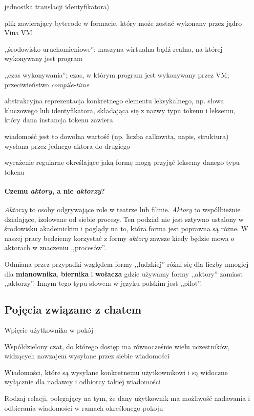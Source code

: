 \begin{labeling}{jednostka translacji}
        identyfikatora)
    \item[plik wykonywalny] plik zawierający bytecode w formacie, który może zostać wykonany przez jądro Viua
        VM
    \item[runtime] ,,środowisko uruchomieniowe''; maszyna wirtualna bądź realna, na której
        wykonywany jest program
    \item[\emph{run-time}] ,,czas wykonywania''; czas, w którym program jest wykonywany przez VM;
        przeciwieństwo \emph{compile-time}
    \item[token] abstrakcyjna reprezentacja konkretnego elementu leksykalnego, np. słowa kluczowego lub
        identyfikatora, składająca się z nazwy typu tokenu i leksemu, który dana instancja tokenu zawiera
	\item[wiadomość] wiadomość jest to dowolna wartość (np. liczba całkowita,
		napis, struktura) wysłana przez jednego aktora do drugiego
    \item[wzorzec] wyrażenie regularne określające jaką formę mogą przyjąć leksemy danego typu tokenu
\end{labeling}

\paragraph*{Czemu \emph{aktory}, a nie \emph{aktorzy}?}
\label{glossary_actors}

\emph{Aktorzy} to osoby odgrywające role w teatrze lub filmie. \emph{Aktory} to
współbieżnie działające, izolowane od siebie procesy. Ten podział nie jest
sztywno ustalony w środowisku akademickim i poglądy na to, która forma jest
poprawna są różne. W naszej pracy będziemy korzystać z formy \emph{aktory}
zawsze kiedy będzie mowa o aktorach w znaczeniu ,,procesów''.

Odmiana przez przypadki względem formy ,,ludzkiej'' różni się dla liczby mnogiej
dla \textbf{mianownika}, \textbf{biernika} i \textbf{wołacza} gdzie używamy
formy ,,aktory'' zamiast ,,aktorzy''. Innym tego typu słowem w języku polskim
jest ,,pilot''.

\subsection{Pojęcia związane z chatem}
\label{slownik_pojec_chatu}

\begin{labeling}{Wpięcie użytkownika w pokój}
    \item[Pokój] Współdzielony czat, do którego dostęp ma równocześnie wielu uczestników, widzących nawzajem
        wysyłane przez siebie wiadomości
    \item[Wiadomości prywatne] Wiadomości, które są wysyłane konkretnemu użytkownikowi i są widoczne wyłącznie
        dla nadawcy i odbiorcy takiej wiadomości
    \item[Wpięcie użytkownika w pokój] Rodzaj relacji, polegający na tym, że dany użytkownik ma możliwość
        nadawania i odbierania wiadomości w ramach określonego pokoju
\end{labeling}
